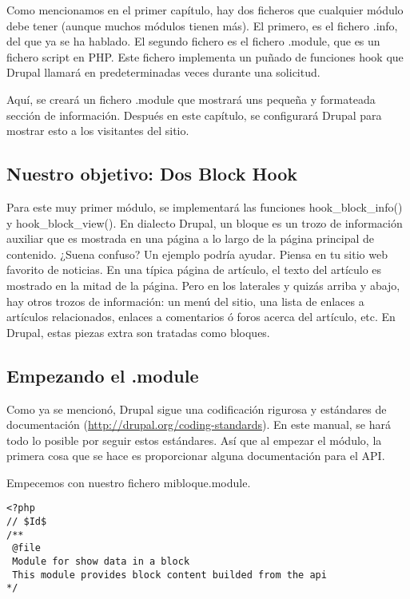 \documentclass[11pt]{article}
\begin{document}
Como mencionamos en el primer capítulo, hay dos ficheros que cualquier
módulo debe tener (aunque muchos módulos tienen más). El primero, es
el fichero .info, del que ya se ha hablado. El segundo fichero es el
fichero .module, que es un fichero script en PHP. Este fichero
implementa un puñado de funciones hook que Drupal llamará en
predeterminadas veces durante una solicitud.

Aquí, se creará un fichero .module que mostrará uns pequeña y
formateada sección de información. Después en este capítulo, se
configurará Drupal para mostrar esto a los visitantes del sitio.

\subsection{Nuestro objetivo: Dos Block Hook}
\label{sec-2.7}


Para este muy primer módulo, se implementará las funciones
hook\_block\_info() y hook\_block\_view(). En dialecto Drupal, un bloque
es un trozo de información auxiliar que es mostrada en una página a lo
largo de la página principal de contenido. ¿Suena confuso? Un ejemplo
podría ayudar. Piensa en tu sitio web favorito de noticias. En una
típica página de artículo, el texto del artículo es mostrado en la
mitad de la página. Pero en los laterales y quizás arriba y abajo, hay
otros trozos de información: un menú del sitio, una lista de enlaces a
artículos relacionados, enlaces a comentarios ó foros acerca del
artículo, etc. En Drupal, estas piezas extra son tratadas como
bloques.

\subsection{Empezando el .module}
\label{sec-2.8}


Como ya se mencionó, Drupal sigue una codificación rigurosa y
estándares de documentación (\href{http://drupal.org/coding-standards}{http://drupal.org/coding-standards}). En
este manual, se hará todo lo posible por seguir estos estándares. Así
que al empezar el módulo, la primera cosa que se hace es proporcionar
alguna documentación para el API.

Empecemos con nuestro fichero  mibloque.module.


\begin{verbatim}
<?php 
// $Id$ 
/** 
 @file 
 Module for show data in a block
 This module provides block content builded from the api
*/
\end{verbatim}
\end{document}
